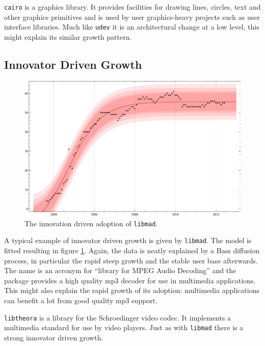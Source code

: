 \documentclass[smallextended,final]{svjour3}
\begin{document}
\verb|cairo| is a graphics library. It provides facilities for drawing lines, circles, text and other graphics primitives and is used by user graphics-heavy projects such as user interface libraries. Much like \verb|udev| it is an architectural change at a low level, this might explain its similar growth pattern.


\subsection{Innovator Driven Growth}

\begin{figure}
\vspace{-2em}
\small\centering
\includegraphics[width=\linewidth]{BassFit-libmad2.pdf}
\caption{The innovation driven adoption of \texttt{libmad}.}\label{fig:libmad}
\vspace{-1em}
\end{figure}

A typical example of innovator driven growth is given by \verb|libmad|. The model is fitted resulting in figure \ref{fig:libmad}. Again, the data is neatly explained by a Bass diffusion process, in particular the rapid steep growth and the stable user base afterwards. The name is an acronym for ``library for MPEG Audio Decoding'' and the package provides a high quality mp3 decoder for use in multimedia applications. This might also explain the rapid growth of its adoption: multimedia applications can benefit a lot from good quality mp3 support.

\verb|libtheora| is a library for the Schroedinger video codec. It implements a multimedia standard for use by video players. Just as with \verb|libmad| there is a strong innovator driven growth.
\end{document}
